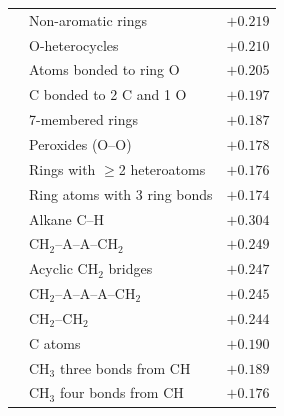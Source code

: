\begin{table}[htbp]
\begin{tabular}{l p{} r}
\midrule
{} & Non-aromatic rings & $+0.219$ \\
 & O-heterocycles & $+0.210$ \\
 & Atoms bonded to ring O & $+0.205$ \\
 & C bonded to 2 C and 1 O & $+0.197$ \\
 & 7-membered rings & $+0.187$ \\
 & Peroxides (O--O) & $+0.178$ \\
 & Rings with $\geq$2 heteroatoms & $+0.176$ \\
 & Ring atoms with 3 ring bonds & $+0.174$ \\
\midrule
{} & Alkane C--H & $+0.304$ \\
 & CH$_2$--A--A--CH$_2$ & $+0.249$ \\
 & Acyclic CH$_2$ bridges & $+0.247$ \\
 & CH$_2$--A--A--A--CH$_2$ & $+0.245$ \\
 & CH$_2$--CH$_2$ & $+0.244$ \\
 & C atoms & $+0.190$ \\
 & CH$_3$ three bonds from CH & $+0.189$ \\
 & CH$_3$ four bonds from CH & $+0.176$ \\
\bottomrule
\end{tabular}
\end{table}
